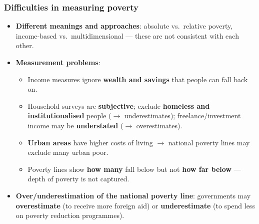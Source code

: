\documentclass[a4paper,12pt]{article}
\begin{document}
\subsubsection*{Difficulties in measuring poverty}
\begin{itemize}
  \item \textbf{Different meanings and approaches}: absolute vs.\ relative poverty, income-based vs.\ multidimensional --- these are not consistent with each other.
  \item \textbf{Measurement problems}:
  \begin{itemize}
    \item Income measures ignore \textbf{wealth and savings} that people can fall back on.
    \item Household surveys are \textbf{subjective}; exclude \textbf{homeless and institutionalised} people ($\to$ underestimates); freelance/investment income may be \textbf{understated} ($\to$ overestimates).
    \item \textbf{Urban areas} have higher costs of living $\to$ national poverty lines may exclude many urban poor.
    \item Poverty lines show \textbf{how many} fall below but not \textbf{how far below} --- depth of poverty is not captured.
  \end{itemize}
  \item \textbf{Over/underestimation of the national poverty line}: governments may \textbf{overestimate} (to receive more foreign aid) or \textbf{underestimate} (to spend less on poverty reduction programmes).
\end{itemize}
\end{document}
